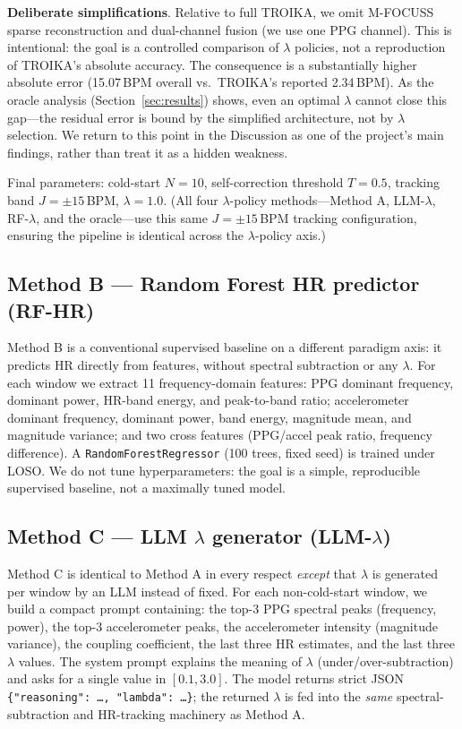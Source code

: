 \documentclass[sigconf,nonacm,11pt]{acmart}
\begin{document}
\textbf{Deliberate simplifications}. Relative to full TROIKA, we omit M-FOCUSS sparse reconstruction and dual-channel fusion (we use one PPG channel). This is intentional: the goal is a controlled comparison of $\lambda$ policies, not a reproduction of TROIKA's absolute accuracy. The consequence is a substantially higher absolute error (15.07\,BPM overall vs.\ TROIKA's reported 2.34\,BPM). As the oracle analysis (Section~\ref{sec:results}) shows, even an optimal $\lambda$ cannot close this gap---the residual error is bound by the simplified architecture, not by $\lambda$ selection. We return to this point in the Discussion as one of the project's main findings, rather than treat it as a hidden weakness.

Final parameters: cold-start $N = 10$, self-correction threshold $T = 0.5$, tracking band $J = \pm 15$\,BPM, $\lambda = 1.0$. (All four $\lambda$-policy methods---Method A, LLM-$\lambda$, RF-$\lambda$, and the oracle---use this same $J = \pm 15$\,BPM tracking configuration, ensuring the pipeline is identical across the $\lambda$-policy axis.)

\subsection{Method B --- Random Forest HR predictor (RF-HR)}

Method B is a conventional supervised baseline on a different paradigm axis: it predicts HR directly from features, without spectral subtraction or any $\lambda$. For each window we extract 11 frequency-domain features: PPG dominant frequency, dominant power, HR-band energy, and peak-to-band ratio; accelerometer dominant frequency, dominant power, band energy, magnitude mean, and magnitude variance; and two cross features (PPG/accel peak ratio, frequency difference). A \texttt{RandomForestRegressor} (100 trees, fixed seed) is trained under LOSO. We do not tune hyperparameters: the goal is a simple, reproducible supervised baseline, not a maximally tuned model.

\subsection{Method C --- LLM $\lambda$ generator (LLM-$\lambda$)}

Method C is identical to Method A in every respect \emph{except} that $\lambda$ is generated per window by an LLM instead of fixed. For each non-cold-start window, we build a compact prompt containing: the top-3 PPG spectral peaks (frequency, power), the top-3 accelerometer peaks, the accelerometer intensity (magnitude variance), the coupling coefficient, the last three HR estimates, and the last three $\lambda$ values. The system prompt explains the meaning of $\lambda$ (under/over-subtraction) and asks for a single value in $[0.1, 3.0]$. The model returns strict JSON \texttt{\{"reasoning":~\ldots,~"lambda":~\ldots\}}; the returned $\lambda$ is fed into the \emph{same} spectral-subtraction and HR-tracking machinery as Method A.
\end{document}
